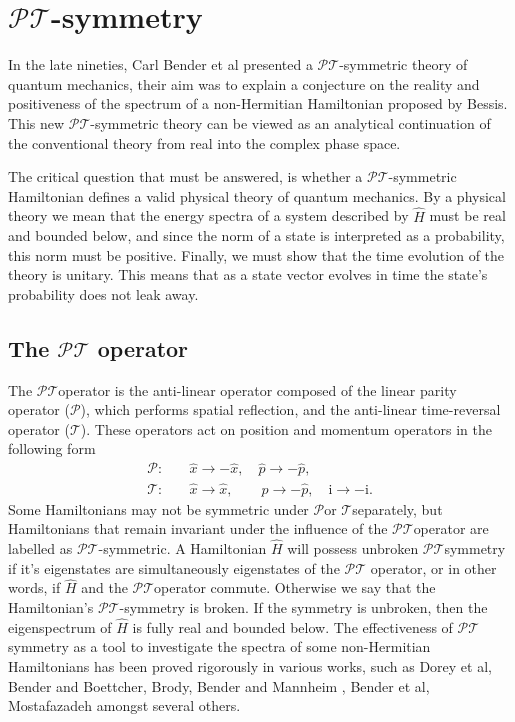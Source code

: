 \documentclass[12pt, a4paper]{report}
\newcommand\PT{\(\mathcal{PT}\)}
\newcommand\PP{\(\mathcal{P}\)}
\newcommand\TT{\(\mathcal{T}\)}
\begin{document}
\section{\texorpdfstring{$\mathcal{PT}$}\:-symmetry}\label{PT}
In the late nineties, Carl Bender et al presented a \PT-symmetric theory of quantum mechanics, their aim was to explain a conjecture on the reality and positiveness of the spectrum of a non-Hermitian Hamiltonian proposed by Bessis\cite{Bender1998}. This new \PT-symmetric theory can be viewed as an analytical continuation of the conventional theory from real into the complex phase space\cite{PT-symmetricQM}.

The critical question that must be answered, is whether a \PT-symmetric Hamiltonian defines a valid physical theory of quantum mechanics. By a physical theory we mean that the energy spectra of a system described by $\hat{H}$ must be real and bounded below, and since the norm of a state is interpreted as a probability, this norm must be positive. Finally, we must show that the time evolution of the theory is unitary. This means that as a state vector evolves in time the state's probability does not leak away\cite{MustaHbeHermitian}\cite{MakingSense}.

\subsection{The \texorpdfstring{$\mathcal{PT}$}\: operator}
The \PT\:operator is the anti-linear operator composed of the linear parity operator (\PP), which performs spatial reflection, and the anti-linear time-reversal operator (\TT). These operators act on position and momentum operators in the following form
\begin{equation}\label{eq:2}
\begin{split}
\mathcal{P}:& \quad\hat{x} \rightarrow -\hat{x},\quad \hat{p} \rightarrow -\hat{p},\\
\mathcal{T}:& \quad\hat{x} \rightarrow \hat{x},\quad\quad \hat{p} \rightarrow -\hat{p},\quad \mathrm{i} \rightarrow -\mathrm{i}.
\end{split}
\end{equation}
Some Hamiltonians may not be symmetric under \PP\:or \TT\:separately, but Hamiltonians that remain invariant under the influence of the \PT\:operator are labelled as \PT-symmetric. A Hamiltonian $\hat{H}$ will possess unbroken \PT\:symmetry if it's eigenstates are simultaneously eigenstates of the \PT\: operator, or in other words, if $\hat{H}$ and the \PT\:operator commute. Otherwise we say that the Hamiltonian's \PT-symmetry is broken\cite{MakingSense}\cite{ComplexExtension}\cite{MustaHbeHermitian}. If the symmetry is unbroken, then the eigenspectrum of $\hat{H}$ is fully real and bounded below. The effectiveness of \PT\:symmetry as a tool to investigate the spectra of some non-Hermitian Hamiltonians has been proved rigorously in various works, such as Dorey et al\cite{Dorey_2001}, Bender and Boettcher\cite{Bender1998}, Brody\cite{Brody_2016}, Bender and Mannheim \cite{Bender_2010}, Bender et al\cite{PT-symmetricQM}, Mostafazadeh\cite{Mostafazadeh}\cite{Mostafazadeh2} amongst several others. 
\end{document}
